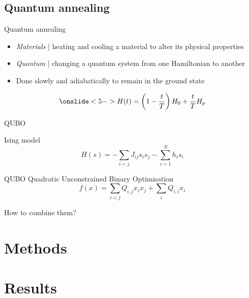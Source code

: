 \documentclass{beamer}
\begin{document}
\subsection{Quantum annealing}

\begin{frame}{Quantum annealing}
    \begin{itemize}
        \item<2-> \textit{Materials} | heating and cooling a material to alter its physical properties
        \item<3-> \textit{Quantum} | changing a quantum system from one Hamiltonian to another
        \item<4-> Done slowly and adiabatically to remain in the ground state
    \end{itemize}
    \vfill
    \begin{equation*}
        \onslide<5->{H(t)=\left(1- \frac{t}{T}\right)H_0 + \frac{t}{T}H_p}
    \end{equation*}
\end{frame}

\begin{frame}{QUBO}
    \begin{exampleblock}{Ising model}
        \begin{equation*}
            H(s) = -\sum_{i<j}J_{ij}s_i s_j - \sum_{i=1}^{N}h_i s_i
        \end{equation*}
    \end{exampleblock}

    \begin{alertblock}{QUBO}
        Quadratic Unconstrained Binary Optimisation
        \begin{equation*}
            f(x)=\sum_{i<j}Q_{i,j}x_ix_j + \sum_iQ_{i,i}x_i
        \end{equation*}
    \end{alertblock}
\end{frame}

\begin{frame}[standout]
    \centering
    How to combine them?
\end{frame}

\section{Methods}
\section{Results}
\end{document}
